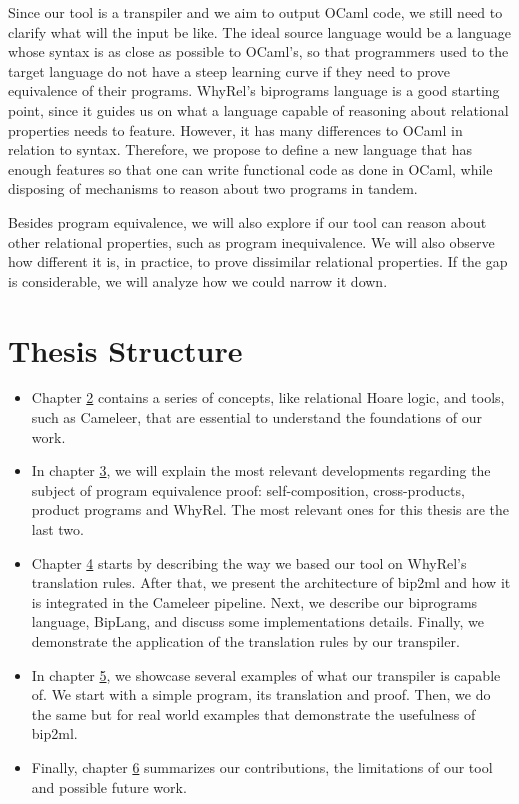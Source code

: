 Since our tool is a transpiler and we aim to output OCaml code, we still need to clarify what will the input be like.
The ideal source language would be a language whose syntax is as close as possible to OCaml's, so that programmers used to the target language do not have a steep learning curve if they need to prove equivalence of their programs. 
WhyRel's biprograms language is a good starting point, since it guides us on what a language capable of reasoning about relational properties needs to feature.
However, it has many differences to OCaml in relation to syntax.
Therefore, we propose to define a new language that has enough features so that one can write functional code as done in OCaml, while disposing of mechanisms to reason about two programs in tandem.

Besides program equivalence, we will also explore if our tool can reason about other relational properties, such as program inequivalence.
We will also observe how different it is, in practice, to prove dissimilar relational properties.
If the gap is considerable, we will analyze how we could narrow it down.


\section{Thesis Structure}

\begin{itemize}
    \setlength\itemsep{0.1em}
    \item Chapter \hyperref[cha:background]{2} contains a series of concepts, like relational Hoare logic, and tools, such as Cameleer, that are essential to understand the foundations of our work.

    \item In chapter \hyperref[cha:state_of_the_art]{3}, we will explain the most relevant developments regarding the subject of program equivalence proof: self-composition, cross-products, product programs and WhyRel.
    The most relevant ones for this thesis are the last two.

    \item Chapter \hyperref[cha:methodology]{4} starts by describing the way we based our tool on WhyRel's translation rules.
    After that, we present the architecture of bip2ml and how it is integrated in the Cameleer pipeline.
    Next, we describe our biprograms language, BipLang, and discuss some implementations details.
    Finally, we demonstrate the application of the translation rules by our transpiler.

    \item In chapter \hyperref[cha:case_studies]{5}, we showcase several examples of what our transpiler is capable of. 
    We start with a simple program, its translation and proof.
    Then, we do the same but for real world examples that demonstrate the usefulness of bip2ml.
    
    \item Finally, chapter \hyperref[cha:conclusion]{6} summarizes our contributions, the limitations of our tool and possible future work.
\end{itemize}




